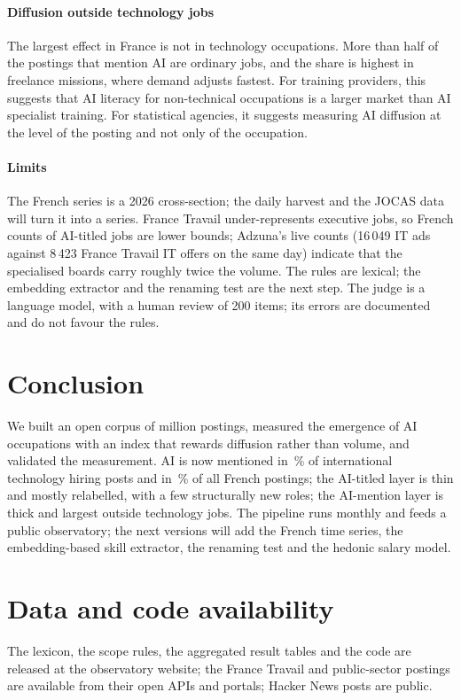 \documentclass[3p,times,10pt,authoryear]{elsarticle}
\begin{document}
\paragraph{Diffusion outside technology jobs} The largest effect in France is not in technology occupations. More than half of the postings that mention AI are ordinary jobs, and the share is highest in freelance missions, where demand adjusts fastest. For training providers, this suggests that AI literacy for non-technical occupations is a larger market than AI specialist training. For statistical agencies, it suggests measuring AI diffusion at the level of the posting and not only of the occupation.

\paragraph{Limits} The French series is a 2026 cross-section; the daily harvest and the JOCAS data will turn it into a series. France Travail under-represents executive jobs, so French counts of AI-titled jobs are lower bounds; Adzuna's live counts (16\,049 IT ads against 8\,423 France Travail IT offers on the same day) indicate that the specialised boards carry roughly twice the volume. The rules are lexical; the embedding extractor and the renaming test are the next step. The judge is a language model, with a human review of 200 items; its errors are documented and do not favour the rules.

\section{Conclusion}\label{sec:concl}
We built an open corpus of \nAll{} million postings, measured the emergence of AI occupations with an index that rewards diffusion rather than volume, and validated the measurement. AI is now mentioned in \hnAIlast\,\% of international technology hiring posts and in \pAI\,\% of all French postings; the AI-titled layer is thin and mostly relabelled, with a few structurally new roles; the AI-mention layer is thick and largest outside technology jobs. The pipeline runs monthly and feeds a public observatory; the next versions will add the French time series, the embedding-based skill extractor, the renaming test and the hedonic salary model.

\section*{Data and code availability}
The lexicon, the scope rules, the aggregated result tables and the code are released at the observatory website; the France Travail and public-sector postings are available from their open APIs and portals; Hacker News posts are public.
\end{document}
